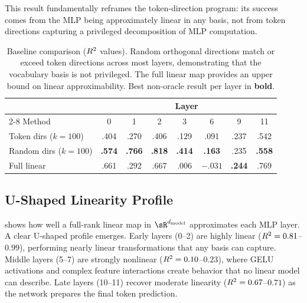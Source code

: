 This result fundamentally reframes the token-direction program: its success comes from the MLP being approximately linear in any basis, not from token directions capturing a privileged decomposition of MLP computation.

\begin{table}[t]
    \centering
    \caption{Baseline comparison ($R^2$ values). Random orthogonal directions match or exceed token directions across most layers, demonstrating that the vocabulary basis is not privileged. The full linear map provides an upper bound on linear approximability. Best non-oracle result per layer in \textbf{bold}.}
    \label{tab:baseline}
    \begin{tabular}{@{}lccccccc@{}}
        \toprule
        & \multicolumn{7}{c}{Layer} \\
        \cmidrule(lr){2-8}
        Method & 0 & 1 & 2 & 3 & 6 & 9 & 11 \\
        \midrule
        Token dirs ($k{=}100$) & .404 & .270 & .406 & .129 & .091 & .237 & .542 \\
        Random dirs ($k{=}100$) & \textbf{.574} & \textbf{.766} & \textbf{.818} & \textbf{.414} & \textbf{.163} & .235 & \textbf{.558} \\
        Full linear & .661 & .292 & .667 & .006 & $-.031$ & \textbf{.244} & .769 \\
        \bottomrule
    \end{tabular}
\end{table}

\subsection{U-Shaped Linearity Profile}
\label{sec:res_linearity}

 shows how well a full-rank linear map in $\sR^{\dmodel}$ approximates each MLP layer.
A clear U-shaped profile emerges.
Early layers (0--2) are highly linear ($R^2 = 0.81$--$0.99$), performing nearly linear transformations that any basis can capture.
Middle layers (5--7) are strongly nonlinear ($R^2 = 0.10$--$0.23$), where GELU activations and complex feature interactions create behavior that no linear model can describe.
Late layers (10--11) recover moderate linearity ($R^2 = 0.67$--$0.71$) as the network prepares the final token prediction.

